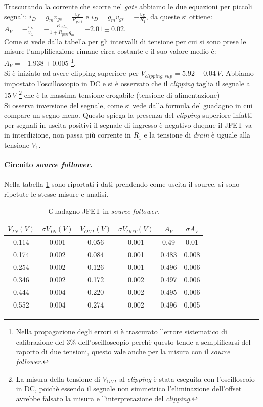 \documentclass[10pt,a4paper]{article}
\begin{document}
Trascurando la corrente che scorre nel \emph{gate} abbiamo le due equazioni per piccoli segnali: $i_D = g_m v_{gs} = \frac{v_S}{R_{part}}$ e $i_D = g_m v_{gs} = -\frac{v_D}{R_1}$, da queste si ottiene: $A_V = -\frac{v_D}{v_G} = - \frac{R_1 g_m}{1+R_{part} g_m} = -2.01\pm0.02$. \\
Come si vede dalla tabella per gli intervalli di tensione per cui si sono prese le misure l'amplificazione rimane circa costante e il suo valore medio è: $A_V = -1.938\pm0.005$ \footnote{Nella propagazione degli errori si è trascurato l'errore sistematico di calibrazione del  $3\%$ dell'oscilloscopio perchè questo tende a semplificarsi del raporto di due tensioni, questo vale anche per la misura con il \emph{source follower}.}. \\
Si è iniziato ad avere clipping superiore per $V_{clipping, sup} = 5.92\pm0.04 \, V$. Abbiamo impostato l'oscilloscopio in DC e si è osservato che il \emph{clipping} taglia il segnale a $15\,V$ \footnote{La misura della tensione di $V_{OUT}$ al \emph{clipping} è stata eseguita con l'oscilloscoio in DC, poichè essendo il segnale non simmetrico l'eliminazione dell'offset avrebbe falsato la misura e l'interpretazione del \emph{clipping}.} che è la massima tensione erogabile (tensione di alimentazione)\\
Si osserva inversione del segnale, come si vede dalla formula del guadagno in cui compare un segno meno. Questo spiega la presenza del \emph{clipping} superiore infatti per segnali in uscita positivi il segnale di ingresso è negativo duqnue il JFET va in interdizione, non passa più corrente in $R_1$ e la tensione di \emph{drain} è uguale alla tensione $V_1$. 
\paragraph{Circuito \emph{source follower}.}
Nella tabella \ref{tabellaSourceFollower} sono riportati i dati prendendo come uscita il source, si sono ripetute le stesse misure e analisi.

\begin{table}[!htb]\centering
\begin{tabular}{|c|c|c|c|c|c|}
\hline
$V_{IN} (V)$ & $\sigma V_{IN} (V)$ & $V_{OUT} (V)$ & $\sigma V_{OUT} (V)$ & $A_V$ & $\sigma A_V$\\
\hline
0.114 & 0.001 & 0.056 & 0.001 & 0.49 & 0.01\\
0.174 & 0.002 & 0.084 & 0.001 & 0.483 & 0.008\\
0.254 & 0.002 & 0.126 & 0.001 & 0.496 & 0.006\\
0.346 & 0.002 & 0.172 & 0.002 & 0.497 & 0.006\\
0.444 & 0.004 & 0.220 & 0.002 & 0.495 & 0.006\\
0.552 & 0.004 & 0.274 & 0.002 & 0.496 & 0.005\\
\hline
\end{tabular}
\caption{Guadagno JFET in \emph{source follower}.}
\label{tabellaSourceFollower}
\end{table}
\end{document}
